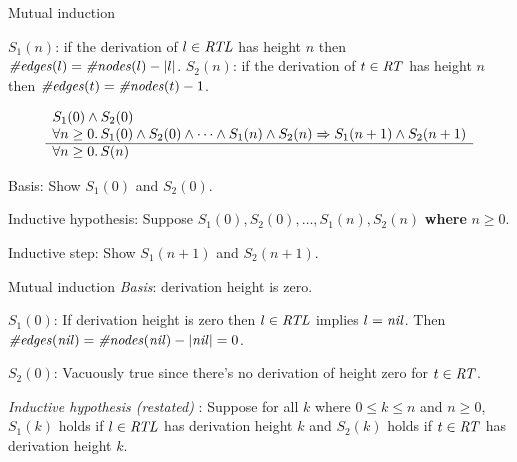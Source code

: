 \begin{wideslide}[bm=,toc=]{Mutual induction}

\vspace{1em}
$S_1(n)$: if the derivation of $l\in \mbox{\it RTL\/}$ has height $n$ then
$\mbox{\it \#edges\/}(l) = \mbox{\it \#nodes\/}(l) - |l|$.
$S_2(n)$: if the derivation of $t\in \mbox{\it RT\/}$ has height $n$ then
$\mbox{\it \#edges\/}(t) = \mbox{\it \#nodes\/}(t) - 1$.

\vspace{1em}



\begin{displaymath}
\begin{array}[t]{l}
S_1(0)\wedge S_2(0) \\
\forall n\geq 0.\, S_1(0)\wedge S_2(0) \wedge \cdots \wedge
S_1(n)\wedge S_2(n)\Rightarrow S_1(n+1)\wedge S_2(n+1)\\
\hline
\forall n\geq 0.\, S(n)
\end{array}
\end{displaymath}

\vspace{1em}
Basis: Show $S_1(0)$ and $S_2(0)$.

\vspace{1em}
Inductive hypothesis: Suppose $S_1(0), S_2(0), \ldots ,S_1(n),S_2(n)$ {\bf where} $n\geq 0$.

\vspace{1em}
Inductive step: Show $S_1(n+1)$ and $S_2(n+1)$.

\end{wideslide}
\begin{wideslide}[bm=,toc=]{Mutual induction}
{\em Basis\/}: derivation height is zero.

\vspace{1em}
$S_1(0)$: If derivation height is zero then $l\in\mbox{\it RTL\/}$ implies $l=\mbox{\it nil\/}$.
Then $\mbox{\it \#edges\/}(\mbox{\it nil\/})=\mbox{\it \#nodes\/}(\mbox{\it nil\/}) - |\mbox{\it nil\/}| = 0$.

\vspace{1em}
$S_2(0)$: Vacuously true since there's no derivation of height zero for $t\in\mbox{\it RT\/}$.

\vspace{2em}
{\em Inductive hypothesis (restated)\/} :  Suppose for all $k$ where $0\leq k\leq n$ and $n\geq 0$,
$S_1(k)$ holds if $l\in\mbox{\it RTL\/}$ has derivation height $k$ and
$S_2(k)$ holds if $t\in\mbox{\it RT\/}$ has derivation height $k$.
\end{wideslide}

